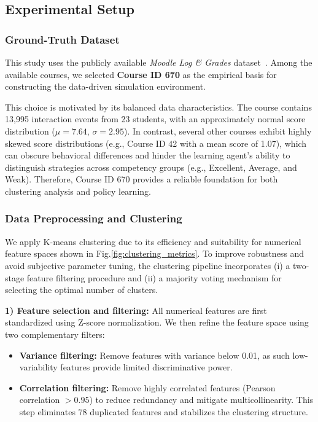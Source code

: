 \documentclass[conference]{IEEEtran}
\begin{document}
\subsection{Experimental Setup}

\subsubsection{Ground-Truth Dataset}
This study uses the publicly available \textit{Moodle Log \& Grades} dataset~\cite{dataset_kaggle}. Among the available courses, we selected \textbf{Course ID 670} as the empirical basis for constructing the data-driven simulation environment.

This choice is motivated by its balanced data characteristics. The course contains 13{,}995 interaction events from 23 students, with an approximately normal score distribution ($\mu = 7.64$, $\sigma = 2.95$). In contrast, several other courses exhibit highly skewed score distributions (e.g., Course ID 42 with a mean score of 1.07), which can obscure behavioral differences and hinder the learning agent’s ability to distinguish strategies across competency groups (e.g., Excellent, Average, and Weak). Therefore, Course ID 670 provides a reliable foundation for both clustering analysis and policy learning.

\subsubsection{Data Preprocessing and Clustering}
We apply K-means clustering due to its efficiency and suitability for numerical feature spaces shown in Fig.\ref{fig:clustering_metrics}. To improve robustness and avoid subjective parameter tuning, the clustering pipeline incorporates (i) a two-stage feature filtering procedure and (ii) a majority voting mechanism for selecting the optimal number of clusters.

\textbf{1) Feature selection and filtering:}
All numerical features are first standardized using Z-score normalization. We then refine the feature space using two complementary filters:
\begin{itemize}
    \item \textbf{Variance filtering:} Remove features with variance below 0.01, as such low-variability features provide limited discriminative power.
    \item \textbf{Correlation filtering:} Remove highly correlated features (Pearson correlation $> 0.95$) to reduce redundancy and mitigate multicollinearity. This step eliminates 78 duplicated features and stabilizes the clustering structure.
\end{itemize}
\end{document}
